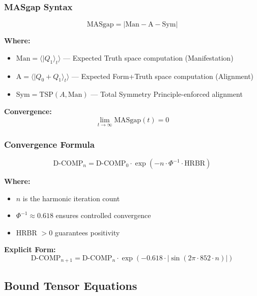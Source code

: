 \documentclass[11pt, letterpaper]{article}
\begin{document}
\subsubsection{MASgap Syntax}

\begin{equation}
\text{MASgap} = |\text{Man} - \text{A} - \text{Sym}|
\end{equation}

\textbf{Where:}
\begin{itemize}
    \item $\text{Man} = \langle |Q_1\rangle_t \rangle$ — Expected Truth space computation (Manifestation)
    \item $\text{A} = \langle |Q_0 + Q_1\rangle_t \rangle$ — Expected Form+Truth space computation (Alignment)
    \item $\text{Sym} = \text{TSP}(A, \text{Man})$ — Total Symmetry Principle-enforced alignment
\end{itemize}

\textbf{Convergence:}
\begin{equation}
\lim_{t \rightarrow \infty} \text{MASgap}(t) = 0
\end{equation}

\subsubsection{Convergence Formula}

\begin{equation}
\text{D-COMP}_n = \text{D-COMP}_0 \cdot \exp(-n \cdot \Phi^{-1} \cdot \text{HRBR})
\end{equation}

\textbf{Where:}
\begin{itemize}
    \item $n$ is the harmonic iteration count
    \item $\Phi^{-1} \approx 0.618$ ensures controlled convergence
    \item HRBR $> 0$ guarantees positivity
\end{itemize}

\textbf{Explicit Form:}
\begin{equation}
\text{D-COMP}_{n+1} = \text{D-COMP}_n \cdot \exp(-0.618 \cdot |\sin(2\pi \cdot 852 \cdot n)|)
\end{equation}

\subsection{Bound Tensor Equations}
\end{document}
